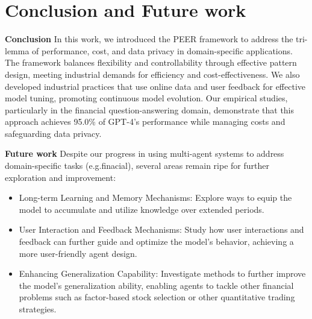 \documentclass[11pt]{article}
\begin{document}
\section{Conclusion and Future work}
\textbf{Conclusion} In this work, we introduced the PEER framework to address the tri-lemma of performance, cost, and data privacy in domain-specific applications. The framework balances flexibility and controllability through effective pattern design, meeting industrial demands for efficiency and cost-effectiveness. We also developed industrial practices that use online data and user feedback for effective model tuning, promoting continuous model evolution. Our empirical studies, particularly in the financial question-answering domain, demonstrate that this approach achieves 95.0\% of GPT-4’s performance while managing costs and safeguarding data privacy.


\textbf{Future work} Despite our progress in using multi-agent systems to address domain-specific tasks (e.g.finacial), several areas remain ripe for further exploration and improvement:
\begin{itemize}
    \item Long-term Learning and Memory Mechanisms: Explore ways to equip the model to accumulate and utilize knowledge over extended periods.
    \item User Interaction and Feedback Mechanisms: Study how user interactions and feedback can further guide and optimize the model's behavior, achieving a more user-friendly agent design.
    \item Enhancing Generalization Capability: Investigate methods to further improve the model's generalization ability, enabling agents to tackle other financial problems such as factor-based stock selection or other quantitative trading strategies.
\end{itemize}

\newpage


\appendix
\end{document}
